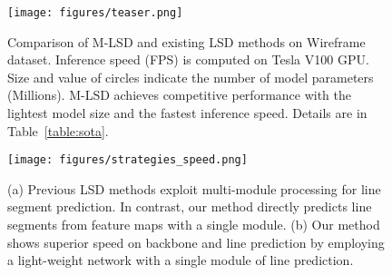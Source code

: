 \documentclass[letterpaper]{article} \usepackage{aaai22}  \usepackage{times}  \usepackage{helvet}  \usepackage{courier}  \usepackage[hyphens]{url}  \usepackage{graphicx} \urlstyle{rm} \def\UrlFont{\rm}  \usepackage{natbib}  \usepackage{caption} \DeclareCaptionStyle{ruled}{labelfont=normalfont,labelsep=colon,strut=off} \frenchspacing  \setlength{\pdfpagewidth}{8.5in}  \setlength{\pdfpageheight}{11in}  \usepackage{algorithm}
\begin{document}
\begin{figure}[t!]
\centering
\texttt{[image: figures/teaser.png]}
\caption{Comparison of M-LSD and existing LSD methods on Wireframe dataset. Inference speed (FPS) is computed on Tesla V100 GPU. Size and value of circles indicate the number of model parameters (Millions). M-LSD achieves competitive performance with the lightest model size and the fastest inference speed. Details are in Table~\ref{table:sota}.}
\label{fig:teaser}
\end{figure}


\begin{figure*}[t!]
\texttt{[image: figures/strategies\_speed.png]}
\caption{(a) Previous LSD methods exploit multi-module processing for line segment prediction. In contrast, our method directly predicts line segments from feature maps with a single module. (b) Our method shows superior speed on backbone and line prediction by employing a light-weight network with a single module of line prediction.}\label{fig:strategy}
\end{figure*}
\end{document}
